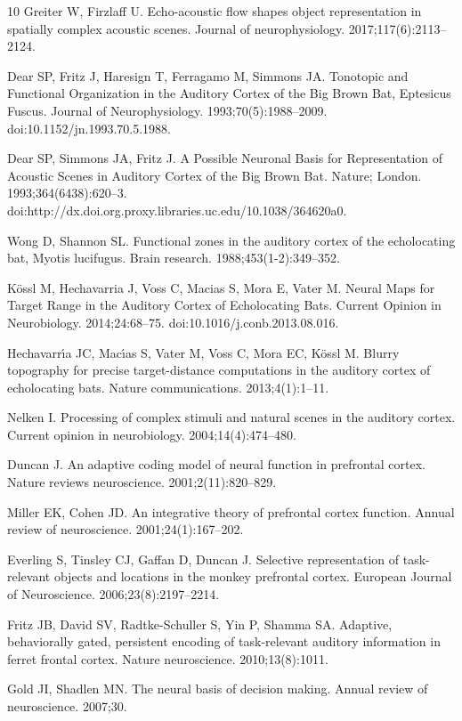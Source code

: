 \documentclass[10pt,letterpaper]{article}
\begin{document}
\begin{thebibliography}{10}
	Greiter W, Firzlaff U.
	\newblock Echo-acoustic flow shapes object representation in spatially complex
	acoustic scenes.
	\newblock Journal of neurophysiology. 2017;117(6):2113--2124.
	
	Dear SP, Fritz J, Haresign T, Ferragamo M, Simmons JA.
	\newblock Tonotopic and Functional Organization in the Auditory Cortex of the
	Big Brown Bat, {{Eptesicus}} Fuscus.
	\newblock Journal of Neurophysiology. 1993;70(5):1988--2009.
	\newblock doi:{10.1152/jn.1993.70.5.1988}.
	
	Dear SP, Simmons JA, Fritz J.
	\newblock A Possible Neuronal Basis for Representation of Acoustic Scenes in
	Auditory Cortex of the Big Brown Bat.
	\newblock Nature; London. 1993;364(6438):620--3.
	\newblock doi:{http://dx.doi.org.proxy.libraries.uc.edu/10.1038/364620a0}.
	
	Wong D, Shannon SL.
	\newblock Functional zones in the auditory cortex of the echolocating bat,
	Myotis lucifugus.
	\newblock Brain research. 1988;453(1-2):349--352.
	
	K{\"o}ssl M, Hechavarria J, Voss C, Macias S, Mora E, Vater M.
	\newblock Neural Maps for Target Range in the Auditory Cortex of Echolocating
	Bats.
	\newblock Current Opinion in Neurobiology. 2014;24:68--75.
	\newblock doi:{10.1016/j.conb.2013.08.016}.
	
	Hechavarr{\'\i}a JC, Mac{\'\i}as S, Vater M, Voss C, Mora EC, K{\"o}ssl M.
	\newblock Blurry topography for precise target-distance computations in the
	auditory cortex of echolocating bats.
	\newblock Nature communications. 2013;4(1):1--11.
	
	Nelken I.
	\newblock Processing of complex stimuli and natural scenes in the auditory
	cortex.
	\newblock Current opinion in neurobiology. 2004;14(4):474--480.
	
	Duncan J.
	\newblock An adaptive coding model of neural function in prefrontal cortex.
	\newblock Nature reviews neuroscience. 2001;2(11):820--829.
	
	Miller EK, Cohen JD.
	\newblock An integrative theory of prefrontal cortex function.
	\newblock Annual review of neuroscience. 2001;24(1):167--202.
	
	Everling S, Tinsley CJ, Gaffan D, Duncan J.
	\newblock Selective representation of task-relevant objects and locations in
	the monkey prefrontal cortex.
	\newblock European Journal of Neuroscience. 2006;23(8):2197--2214.
	
	Fritz JB, David SV, Radtke-Schuller S, Yin P, Shamma SA.
	\newblock Adaptive, behaviorally gated, persistent encoding of task-relevant
	auditory information in ferret frontal cortex.
	\newblock Nature neuroscience. 2010;13(8):1011.
	
	Gold JI, Shadlen MN.
	\newblock The neural basis of decision making.
	\newblock Annual review of neuroscience. 2007;30.
	
\end{thebibliography}
\end{document}
